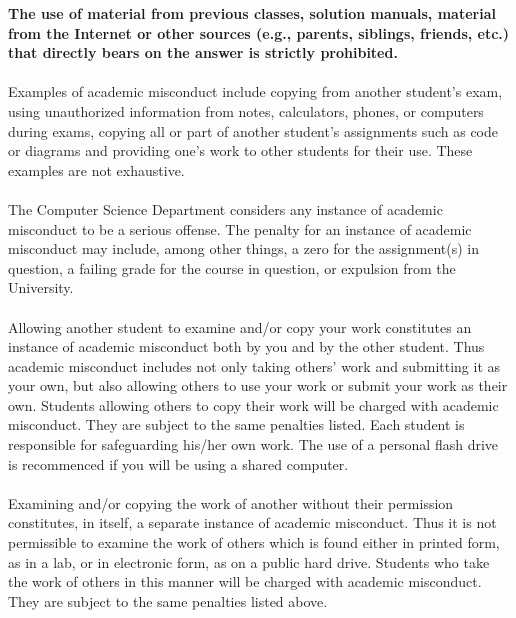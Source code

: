 \documentclass[10pt]{article}
\begin{document}
\begin{enumerate}
\begin{enumerate}[label=\alph*.]
           {\bf The use of material from previous classes, solution
             manuals, material from the Internet or other sources (e.g.,
             parents, siblings, friends, etc.) that directly bears on
             the answer is strictly prohibited.}\\\\ 
           Examples of academic
           misconduct include copying from another student's exam,
           using unauthorized information from notes, calculators,
           phones, or computers during exams, copying all or part of
           another student's assignments such as code or diagrams and
           providing one's work to other students for their use.
           These examples are not exhaustive. \\\\
           The Computer Science Department considers any instance of
           academic misconduct to be a serious offense.  The penalty
           for an instance of academic misconduct may include, among
           other things, a zero for the assignment(s) in question, a
           failing grade for the course in question, or expulsion from
           the University.\\\\  
           Allowing another student to examine and/or copy your work
           constitutes an instance of academic misconduct both by you
           and by the other student. Thus academic misconduct includes
           not only taking others' work and submitting it as your own,
           but also allowing others to use your work or submit your
           work as their own. Students allowing others to copy their
           work will be charged with academic misconduct. They are
           subject to the same penalties listed.  Each student is
           responsible for safeguarding his/her own work.  The use of
           a personal flash drive is recommenced if you will be using
           a shared computer.\\\\  
           Examining and/or copying the work of another without their
           permission constitutes, in itself, a separate instance of
           academic misconduct. Thus it is not permissible to examine
           the work of others which is found either in printed form,
           as in a lab, or in electronic form, as on a public hard
           drive. Students who take the work of others in this manner
           will be charged with academic misconduct. They are subject
           to the same penalties listed above.\\\\

\end{enumerate}
\end{enumerate}
\end{document}
